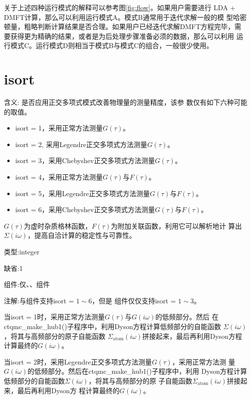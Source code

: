 关于上述四种运行模式的解释可以参考图\ref{fig:flow}。如果用户需要进行
LDA + DMFT计算，那么可以利用运行模式A。模式B通常用于迭代求解一般的模
型哈密顿量，粗略判断计算结果是否合理。如果用户已经迭代求解DMFT方程完毕，需
要获得更为精确的结果，或者是为后处理步骤准备必须的数据，那么可以利用
运行模式C。运行模式D则相当于模式B与模式C的组合，一般很少使用。

\section{isort }
\label{sec:isort}

{\color{red}含义}: 是否应用正交多项式模式改善物理量的测量精度，该参
数仅有如下六种可能的取值。
\begin{itemize}
\item isort = 1，采用正常方法测量$G(\tau)$。
\item isort = 2, 采用Legendre正交多项式方法测量$G(\tau)$。
\item isort = 3，采用Chebyshev正交多项式方法测量$G(\tau)$。
\item isort = 4，采用正常方法测量$G(\tau)$与$F(\tau)$。
\item isort = 5，采用Legendre正交多项式方法测量$G(\tau)$与$F(\tau)$。
\item isort = 6，采用Chebyshev正交多项式方法测量$G(\tau)$与$F(\tau)$。
\end{itemize}

$G(\tau)$为虚时杂质格林函数，$F(\tau)$为附加关联函数，利用它可以解析地计
算出$\Sigma(i\omega)$，提高自洽计算的稳定性与可靠性。

{\color{green}类型}:integer

{\color{blue}缺省}:1

{\color{brown}组件}:仅{\gardenia}、{\narcissus}、{\lavender}组件

{\color{purple}注解}:{\gardenia}与{\narcissus}组件支持isort = $1 \sim 6$，但是{\lavender}
组件仅仅支持isort = $1 \sim 3$。

当isort = 1时，采用正常方法测量$G(\tau)$与$G(i\omega)$的低频部分。然后
在ctqmc\_make\_hub1()子程序中，利用Dyson方程计算低频部分的自能函数
$\Sigma(i\omega)$，将其与高频部分的原子自能函数
$\Sigma_{\text{atom}}(i\omega)$拼接起来，最后再利用Dyson方程计算最终的$G(i\omega)$。

当isort = 2时，采用Legendre正交多项式方法测量$G(\tau)$，采用正常方法测
量$G(i\omega)$的低频部分。然后在ctqmc\_make\_hub1()子程序中，利用
Dyson方程计算低频部分的自能函数$\Sigma(i\omega)$，将其与高频部分的原
子自能函数$\Sigma_{\text{atom}}(i\omega)$拼接起来，最后再利用Dyson方
程计算最终的$G(i\omega)$。

